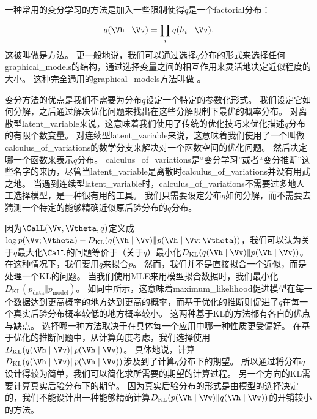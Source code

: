 一种常用的变分学习的方法是加入一些限制使得$q$是一个\gls{factorial}分布：
\begin{align}
	q(\Vh\mid\Vv) = \prod_{i}^{}q(h_i \mid \Vv).
\end{align}
这被叫做是方法。
更一般地说，我们可以通过选择$q$分布的形式来选择任何\gls{graphical_models}的结构，通过选择变量之间的相互作用来灵活地决定近似程度的大小。
这种完全通用的\gls{graphical_models}方法叫做 \citep{Saul96}。


变分方法的优点是我们不需要为分布$q$设定一个特定的参数化形式。
我们设定它如何分解，之后通过解决优化问题来找出在这些分解限制下最优的概率分布。
对离散型\gls{latent_variable}来说，这意味着我们使用了传统的优化技巧来优化描述$q$分布的有限个数变量。
对连续型\gls{latent_variable}来说，这意味着我们使用了一个叫做\gls{calculus_of_variations}的数学分支来解决对一个函数空间的优化问题。
然后决定哪一个函数来表示$q$分布。
\gls{calculus_of_variations}是``变分学习''或者``变分推断''这些名字的来历，尽管当\gls{latent_variable}是离散时\gls{calculus_of_variations}并没有用武之地。
当遇到连续型\gls{latent_variable}时，\gls{calculus_of_variations}不需要过多地人工选择模型，是一种很有用的工具。
我们只需要设定分布$q$如何分解，而不需要去猜测一个特定的能够精确近似原后验分布的$q$分布。


因为$\CalL(\Vv,\Vtheta,q)$定义成$\log p(\Vv;\Vtheta) - D_{\text{KL}} (q(\Vh\mid\Vv) \Vert  p(\Vh\mid\Vv;\Vtheta) )$，我们可以认为关于$q$最大化$\CalL$的问题等价于（关于$q$）最小化$D_{\text{KL}}(q(\Vh\mid\Vv)\Vert p(\Vh\mid\Vv))$。
在这种情况下，我们要用$q$来拟合$p$。
然而，我们并不是直接拟合一个近似，而是处理一个\gls{KL}的问题。
当我们使用\gls{MLE}来用模型拟合数据时，我们最小化$D_{\text{KL}}(p_{\text{data}} \Vert p_{\text{model}})$。
如同中所示，这意味着\gls{maximum_likelihood}促进模型在每一个数据达到更高概率的地方达到更高的概率，而基于优化的推断则促进了$q$在每一个真实后验分布概率较低的地方概率较小。
这两种基于\gls{KL}的方法都有各自的优点与缺点。
选择哪一种方法取决于在具体每一个应用中哪一种性质更受偏好。
在基于优化的推断问题中，从计算角度考虑，我们选择使用$D_{\text{KL}}(q(\Vh\mid\Vv)\Vert p(\Vh\mid\Vv))$。
具体地说，计算$D_{\text{KL}}(q(\Vh\mid\Vv)\Vert p(\Vh\mid\Vv))$涉及到了计算$q$分布下的期望。
所以通过将分布$q$设计得较为简单，我们可以简化求所需要的期望的计算过程。
另一个方向的\gls{KL}需要计算真实后验分布下的期望。
因为真实后验分布的形式是由模型的选择决定的，我们不能设计出一种能够精确计算$D_{\text{KL}}(p(\Vh\mid\Vv) \Vert q(\Vh\mid\Vv))$的开销较小的方法。




